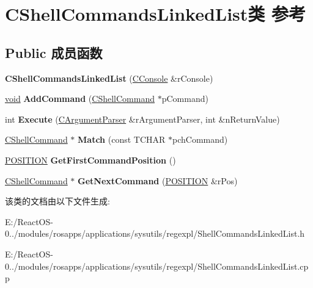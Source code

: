 \hypertarget{class_c_shell_commands_linked_list}{}\section{C\+Shell\+Commands\+Linked\+List类 参考}
\label{class_c_shell_commands_linked_list}
\subsection*{Public 成员函数}
\begin{DoxyCompactItemize}
\item 
\mbox{\label{class_c_shell_commands_linked_list_a6862e10fc4e8d053c4c7b353165cc566}} 
{\bfseries C\+Shell\+Commands\+Linked\+List} (\hyperlink{class_c_console}{C\+Console} \&r\+Console)
\item 
\mbox{\label{class_c_shell_commands_linked_list_a01fe1555f70408c412bc1e769e13852c}} 
\hyperlink{interfacevoid}{void} {\bfseries Add\+Command} (\hyperlink{class_c_shell_command}{C\+Shell\+Command} $\ast$p\+Command)
\item 
\mbox{\label{class_c_shell_commands_linked_list_a4e13a91698f64daddbf78d59453b6ef7}} 
int {\bfseries Execute} (\hyperlink{class_c_argument_parser}{C\+Argument\+Parser} \&r\+Argument\+Parser, int \&n\+Return\+Value)
\item 
\mbox{\label{class_c_shell_commands_linked_list_a1d2aa9046a2decbded07823ffbaa131e}} 
\hyperlink{class_c_shell_command}{C\+Shell\+Command} $\ast$ {\bfseries Match} (const T\+C\+H\+AR $\ast$pch\+Command)
\item 
\mbox{\label{class_c_shell_commands_linked_list_a0fbb3d71a41578ed8a3da6d9adc848c5}} 
\hyperlink{struct_____p_o_s_i_t_i_o_n}{P\+O\+S\+I\+T\+I\+ON} {\bfseries Get\+First\+Command\+Position} ()
\item 
\mbox{\label{class_c_shell_commands_linked_list_acd068cf0ca1ffdf33eafabddd84ee79b}} 
\hyperlink{class_c_shell_command}{C\+Shell\+Command} $\ast$ {\bfseries Get\+Next\+Command} (\hyperlink{struct_____p_o_s_i_t_i_o_n}{P\+O\+S\+I\+T\+I\+ON} \&r\+Pos)
\end{DoxyCompactItemize}


该类的文档由以下文件生成\+:\begin{DoxyCompactItemize}
\item 
E\+:/\+React\+O\+S-\/0../modules/rosapps/applications/sysutils/regexpl/Shell\+Commands\+Linked\+List.\+h\item 
E\+:/\+React\+O\+S-\/0../modules/rosapps/applications/sysutils/regexpl/Shell\+Commands\+Linked\+List.\+cpp\end{DoxyCompactItemize}
